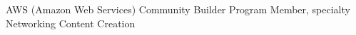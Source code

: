 %
%
%


\begin{scholarship}
					{AWS (Amazon Web Services) Community Builder Program Member, specialty Networking Content Creation}
\end{scholarship}
